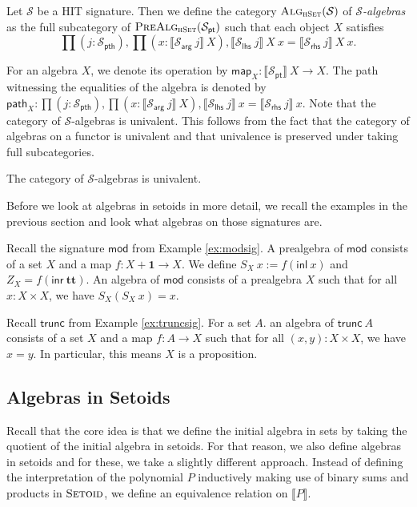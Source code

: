 \documentclass[9pt]{entcs}
\newcommand{\type}[1]{\textsc{#1}}
\newcommand{\term}[1]{\mathsf{#1}}
\newcommand{\constructor}[1]{\mathbf{#1}}
\newcommand{\category}[1]{\textsc{#1}}
\newcommand{\function}[1]{\mathsf{#1}}
\newcommand{\deprod}[3]{\prod(#1 : #2), #3} %
\newcommand{\hset}{\type{hSet}} %
\newcommand{\0}{\textbf{0}} %
\newcommand{\unitt}{\textbf{1}} %
\newcommand{\TT}{\constructor{tt}} %
\newcommand{\inl}{\term{inl}} %
\newcommand{\inr}{\term{inr}} %
\newcommand{\Def}{:=} %
\newcommand{\setoids}{\category{Setoid}} %
\newcommand{\pt}[0]{\textsf{pt}}
\newcommand{\pthI}[0]{\textsf{pth}}
\newcommand{\pthA}[0]{\textsf{arg}}
\newcommand{\pthlh}[0]{\textsf{lhs}}
\newcommand{\pthrh}[0]{\textsf{rhs}}
\newcommand{\pointc}[1]{#1_{\pt}} %
\newcommand{\pathI}[1]{#1_{\pthI}} %
\newcommand{\pathA}[1]{#1_{\pthA}} %
\newcommand{\pathlh}[1]{#1_{\pthlh}} %
\newcommand{\pathrh}[1]{#1_{\pthrh}} %
\newcommand{\modsig}{\function{mod}} %
\newcommand{\trunc}{\function{trunc}} %
\newcommand{\sig}{\mathcal{S}} %
\newcommand{\semP}[1]{\llbracket #1 \rrbracket} %
\newcommand{\prealg}[1]{\category{PreAlg}_{\hset}(#1)} %
\newcommand{\semE}[1]{\llbracket #1 \rrbracket} %
\newcommand{\Alg}[1]{\category{Alg}_{\hset}(#1)} %
\newcommand{\constrA}[1]{\function{map}_{#1}} %
\newcommand{\constrP}[1]{\function{path}_{#1}} %
\begin{document}
\begin{definition}
\label{def:algebra}
Let $\sig$ be a HIT signature.
Then we define the category $\Alg{\sig}$ of \emph{$\sig$-algebras} as the full subcategory of $\prealg{\pointc{\sig}}$ such that each object $X$ satisfies
\[
\deprod{j}{\pathI{\sig}}{\deprod{x}{\semP{\pathA{\sig} \> j} \> X}{\semE{\pathlh{\sig} \> j} \> X \> x = \semE{\pathrh{\sig} \> j} \> X \> x}}.
\]
\end{definition}

For an algebra $X$, we denote its operation by $\constrA{X} : \semP{\pointc{\sig}} \> X \rightarrow X$.
The path witnessing the equalities of the algebra is denoted by $\constrP{X} : \deprod{j}{\pathI{\sig}}{\deprod{x}{\semP{\pathA{\sig} \> j} \> X}{\semE{\pathlh{\sig} \> j} \> x = \semE{\pathrh{\sig} \> j} \> x}}$.
Note that the category of $\sig$-algebras is univalent.
This follows from the fact that the category of algebras on a functor is univalent and that univalence is preserved under taking full subcategories.

\begin{proposition}
\label{prop:univalg}
The category of $\sig$-algebras is univalent.
\end{proposition}

Before we look at algebras in setoids in more detail, we recall the examples in the previous section and look what algebras on those signatures are.

\begin{example}
\label{ex:commalg}
Recall the signature $\modsig$ from Example \ref{ex:modsig}.
A prealgebra of $\modsig$ consists of a set $X$ and a map $f : X + \unitt \rightarrow X$.
We define $S_X \> x \Def f(\inl \> x)$ and $Z_X = f(\inr \> \TT)$.
An algebra of $\modsig$ consists of a prealgebra $X$ such that for all $x : X \times X$, we have $S_X(S_X \> x) = x$.
\end{example}

\begin{example}
\label{ex:truncalg}
Recall $\trunc$ from Example \ref{ex:truncsig}.
For a set $A$. an algebra of $\trunc \> A$ consists of a set $X$ and a map $f : A \rightarrow X$ such that for all $(x , y) : X \times X$, we have $x = y$.
In particular, this means $X$ is a proposition.
\end{example}

\subsection{Algebras in Setoids}
Recall that the core idea is that we define the initial algebra in sets by taking the quotient of the initial algebra in setoids.
For that reason, we also define algebras in setoids and for these, we take a slightly different approach.
Instead of defining the interpretation of the polynomial $P$ inductively making use of binary sums and products in $\setoids$, we define an equivalence relation on $\semP{P}$.
\end{document}
